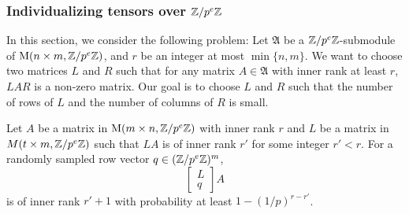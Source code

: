 \subsubsection{Individualizing tensors over $\mathbb{Z}/p^e \mathbb{Z}$}

In this section, we consider the following problem: Let $\mathfrak{A}$ be a $\mathbb{Z} / p^e \mathbb{Z}$-submodule of $\mathrm{M}(n\times m, \mathbb{Z} / p^e \mathbb{Z})$, and $r$ be an integer at most $\min\{n, m\}$. We want to choose two matrices $L$ and $R$ such that for any matrix $A \in \mathfrak{A}$ with inner rank at least $r$, $LAR$ is a non-zero matrix. 
Our goal is to choose $L$ and $R$ such that the number of rows of $L$ and the number of columns of $R$ is small. 

\begin{lemma}\label{lem:sampling_p_to_e}
Let $A$ be a matrix in $\mathrm{M}(m\times n,  \mathbb{Z} / p^e \mathbb{Z})$ with inner rank $r$ and $L$ be a matrix in $M(t\times m,  \mathbb{Z} / p^e \mathbb{Z})$ such that $LA$ is of inner rank $r'$ for some integer $r' < r$. 
For a randomly sampled row vector $q \in (\mathbb{Z} / p^e \mathbb{Z})^m$, 
\[\begin{bmatrix}L \\ q\end{bmatrix}A\] is of inner rank $r' + 1$ with probability at least $1 - (1/p)^{r - r'}$. 
\end{lemma}
